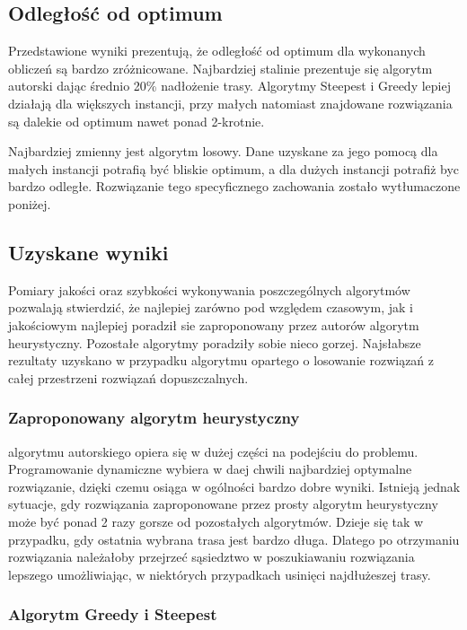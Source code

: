 \subsection{Odległość od optimum}

Przedstawione wyniki prezentują, że odległość od optimum dla wykonanych obliczeń 
są bardzo zróżnicowane. Najbardziej stalinie prezentuje się algorytm autorski 
dając średnio 20\% nadłożenie trasy. Algorytmy Steepest i Greedy lepiej działają dla 
większych instancji, przy małych natomiast znajdowane rozwiązania są dalekie od optimum
nawet ponad 2-krotnie.

Najbardziej zmienny jest algorytm losowy. Dane uzyskane za jego pomocą dla małych instancji
potrafią być bliskie optimum, a dla dużych instancji potrafiż byc bardzo odległe. Rozwiązanie
tego specyficznego zachowania zostało wytłumaczone poniżej.

\subsection{Uzyskane wyniki}

Pomiary jakości oraz szybkości wykonywania poszczególnych algorytmów
pozwalają stwierdzić, że najlepiej zarówno pod względem czasowym, jak i
jakościowym najlepiej poradził sie zaproponowany
przez autorów algorytm heurystyczny. Pozostałe algorytmy poradziły sobie
nieco gorzej. Najsłabsze rezultaty uzyskano w przypadku algorytmu
opartego o losowanie rozwiązań z całej przestrzeni rozwiązań dopuszczalnych.

\subsubsection{Zaproponowany algorytm heurystyczny}

 algorytmu autorskiego opiera się w dużej części na podejściu do problemu. 
Programowanie dynamiczne wybiera w daej chwili najbardziej optymalne rozwiązanie, 
dzięki czemu osiąga w ogólności bardzo dobre wyniki. Istnieją jednak sytuacje, gdy 
rozwiązania zaproponowane przez prosty algorytm heurystyczny może być ponad 2 razy 
gorsze od pozostałych algorytmów. Dzieje się tak w przypadku, gdy ostatnia wybrana 
trasa jest bardzo długa. Dlatego po otrzymaniu rozwiązania należałoby przejrzeć 
sąsiedztwo w poszukiawaniu rozwiązania lepszego umożliwiając, w niektórych przypadkach
usinięci najdłużeszej trasy.

\subsubsection{Algorytm Greedy i Steepest}

